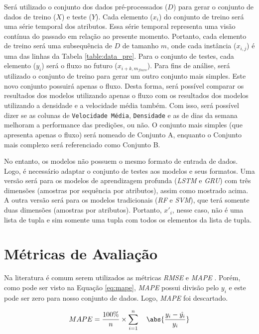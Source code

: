 Será utilizado o conjunto dos dados pré-processados (\(D\)) para gerar o conjunto de dados de treino (\(X\)) e teste (\(Y\)). Cada elemento (\(x_i\)) do conjunto de treino  será uma série temporal dos atributos. Essa série temporal representa uma visão contínua do passado em relação ao presente momento. Portanto, cada elemento de treino será uma subsequência de \(D\) de tamanho \(m\), onde cada instância (\(x_{i, j}\)) é uma das linhas da Tabela \ref{table:data_pre}. Para o conjunto de testes, cada elemento (\(y_i\)) será o fluxo no futuro (\(x_{i + k, m_{fluxo}}\)). Para fins de análise, será utilizado o conjunto de treino para gerar um outro conjunto mais simples. Este novo conjunto possuirá apenas o fluxo. Desta forma, será possível comparar os resultados dos modelos utilizando apenas o fluxo com os resultados dos modelos utilizando a densidade e a velocidade média também. Com isso, será possível dizer se as colunas de \texttt{Velocidade Média}, \texttt{Densidade} e as de dias da semana melhoram a performance das predições, ou não. O conjunto mais simples (que apresenta apenas o fluxo) será nomeado de Conjunto A, enquanto o Conjunto mais complexo será referenciado como Conjunto B.

No entanto, os modelos não possuem o mesmo formato de entrada de dados. Logo, é necessário adaptar o conjunto de testes aos modelos e seus formatos. Uma versão será para os modelos de aprendizagem profunda (\textit{\acrshort{LSTM}} e \textit{\acrshort{GRU}}) com três dimensões (amostras por sequência por atributos), assim como mostrado acima. A outra versão será para os modelos tradicionais (\textit{\acrshort{RF}} e \textit{\acrshort{SVM}}), que terá somente duas dimensões (amostras por atributos). Portanto, \(x'_i\), nesse caso, não é uma lista de tupla e sim somente uma tupla com todos os elementos da lista de tupla.

\section{Métricas de Avaliação}

Na literatura é comum serem utilizados as métricas \textit{\acrshort{RMSE}} e \textit{\acrshort{MAPE}} \cite{lana_2018}. Porém, como pode ser visto na Equação \ref{eq:mape}, \textit{\acrshort{MAPE}} possui divisão pelo \({y_i}\) e este pode ser zero para nosso conjunto de dados. Logo, \textit{\acrshort{MAPE}} foi descartado. 

\begin{equation}
\label{eq:mape}
MAPE = \frac{100\%}{n} \times \sum_{i=1}^{n} \quad \abs{\frac{y_i - \hat{y_i}}{y_i}}
\end{equation}

